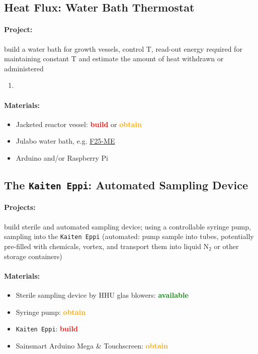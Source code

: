 \documentclass[12pt,a4paper]{scrartcl}
\newcommand{\obtain}[0]{\textcolor{orange}{\textbf{obtain}}}
\newcommand{\avail}[0]{\textcolor{green}{\textbf{available}}}
\newcommand{\build}[0]{\textcolor{red}{\textbf{build}}}
\begin{document}
\newpage
\subsection{Heat Flux: Water Bath Thermostat}
\label{heat}

\paragraph{Project:} build a water bath for growth vessels, control
T, read-out energy required for maintaining constant T and estimate
the amount of heat withdrawn or administered

\begin{enumerate}
\item
\end{enumerate}

\paragraph{Materials:}
\begin{itemize}
\item Jacketed reactor vessel: \build{} or \obtain{}
\item Julabo water bath,
e.g. \href{http://www.laborhandel24.de/9162625-de?utm_source=google_shopping&gclid=Cj0KEQiA496zBRDoi5OY3p2xmaUBEiQArLNnK6uWkryhjvkNdmRLgcg2W_HIO9W1aKaKCO9gmvlkt_MaAmhe8P8HAQ}{F25-ME}
\item Arduino and/or Raspberry Pi
\end{itemize}

\newpage
\subsection{The \texttt{Kaiten Eppi}: Automated Sampling Device} 
\label{sampling}
\paragraph{Projects:} build sterile and automated sampling device; using
a controllable syringe pump, sampling into the \texttt{Kaiten Eppi}
(automated: pump sample into tubes, potentially pre-filled with
chemicals, vortex, and transport them into liquid N$_2$ or other
storage containers)

\paragraph{Materials:}
\begin{itemize}
\item Sterile sampling device by HHU glas blowers: \avail{}
\item Syringe pump: \obtain{}
\item \texttt{Kaiten Eppi}: \build{}
\item Sainsmart Arduino Mega \& Touchscreen: \obtain{}
\end{itemize}
\end{document}
